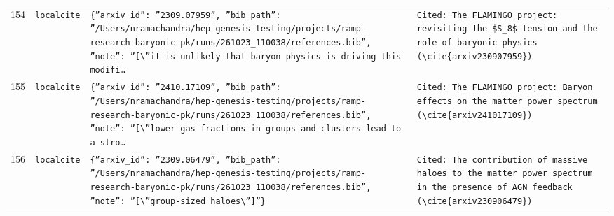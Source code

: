 \documentclass[11pt,a4paper]{article}
\begin{document}
\begin{longtable}{@{}p{}p{}p{}p{}@{}}
154 & \texttt{local}\newline\texttt{cite} & \texttt{\{''arxiv\_\allowbreak{}id'':\allowbreak{} ''2309.07959'',\allowbreak{} ''bib\_\allowbreak{}path'':\allowbreak{} ''/\allowbreak{}Users/\allowbreak{}nramachandra/\allowbreak{}hep-genesis-testing/\allowbreak{}projects/\allowbreak{}ramp-research-baryonic-pk/\allowbreak{}runs/\allowbreak{}261023\_\allowbreak{}110038/\allowbreak{}references.bib'',\allowbreak{} ''note'':\allowbreak{} ''[\textbackslash{}\allowbreak{}''it is unlikely that baryon physics is driving this modifi\ldots{}\allowbreak{}} & \texttt{Cited:\allowbreak{} The FLAMINGO project:\allowbreak{} revisiting the \$S\_\allowbreak{}8\$ tension and the role of baryonic physics (\textbackslash{}\allowbreak{}cite\{arxiv230907959\}\allowbreak{})\allowbreak{}} \\
155 & \texttt{local}\newline\texttt{cite} & \texttt{\{''arxiv\_\allowbreak{}id'':\allowbreak{} ''2410.17109'',\allowbreak{} ''bib\_\allowbreak{}path'':\allowbreak{} ''/\allowbreak{}Users/\allowbreak{}nramachandra/\allowbreak{}hep-genesis-testing/\allowbreak{}projects/\allowbreak{}ramp-research-baryonic-pk/\allowbreak{}runs/\allowbreak{}261023\_\allowbreak{}110038/\allowbreak{}references.bib'',\allowbreak{} ''note'':\allowbreak{} ''[\textbackslash{}\allowbreak{}''lower gas fractions in groups and clusters lead to a stro\ldots{}\allowbreak{}} & \texttt{Cited:\allowbreak{} The FLAMINGO project:\allowbreak{} Baryon effects on the matter power spectrum (\textbackslash{}\allowbreak{}cite\{arxiv241017109\}\allowbreak{})\allowbreak{}} \\
156 & \texttt{local}\newline\texttt{cite} & \texttt{\{''arxiv\_\allowbreak{}id'':\allowbreak{} ''2309.06479'',\allowbreak{} ''bib\_\allowbreak{}path'':\allowbreak{} ''/\allowbreak{}Users/\allowbreak{}nramachandra/\allowbreak{}hep-genesis-testing/\allowbreak{}projects/\allowbreak{}ramp-research-baryonic-pk/\allowbreak{}runs/\allowbreak{}261023\_\allowbreak{}110038/\allowbreak{}references.bib'',\allowbreak{} ''note'':\allowbreak{} ''[\textbackslash{}\allowbreak{}''group-sized haloes\textbackslash{}\allowbreak{}'']\allowbreak{}''\}\allowbreak{}} & \texttt{Cited:\allowbreak{} The contribution of massive haloes to the matter power spectrum in the presence of AGN feedback (\textbackslash{}\allowbreak{}cite\{arxiv230906479\}\allowbreak{})\allowbreak{}} \\

\end{longtable}
\end{document}
